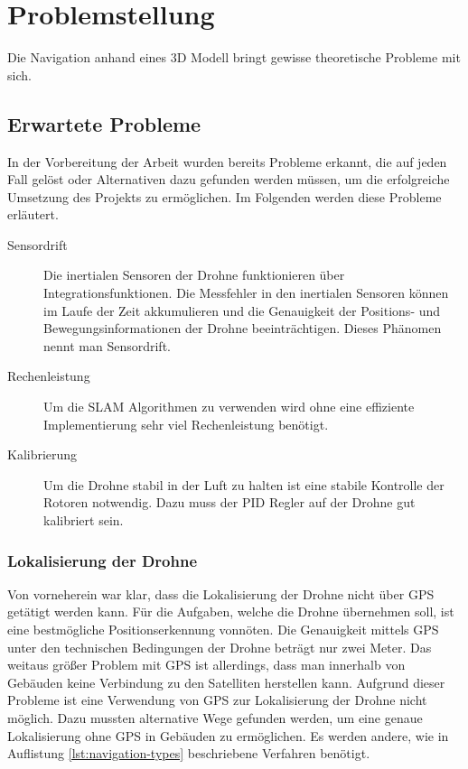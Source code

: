 \chapter{Problemstellung}

Die Navigation anhand eines 3D Modell bringt gewisse theoretische Probleme mit sich.

\section{Erwartete Probleme} \label{erwartete_probleme:section}

In der Vorbereitung der Arbeit wurden bereits Probleme erkannt, die auf jeden Fall gelöst oder Alternativen dazu gefunden werden müssen, um die erfolgreiche Umsetzung des Projekts zu ermöglichen. Im Folgenden werden diese Probleme erläutert.

\begin{description}
    \item[Sensordrift] Die inertialen Sensoren der Drohne funktionieren über Integrationsfunktionen. Die Messfehler in den inertialen Sensoren können im Laufe der Zeit akkumulieren und die Genauigkeit der Positions- und Bewegungsinformationen der Drohne beeinträchtigen. Dieses Phänomen nennt man Sensordrift.
    \item[Rechenleistung] Um die \ac{SLAM} Algorithmen zu verwenden wird ohne eine effiziente Implementierung sehr viel Rechenleistung benötigt.
    \item[Kalibrierung] Um die Drohne stabil in der Luft zu halten ist eine stabile Kontrolle der Rotoren notwendig. Dazu muss der \ac{PID} Regler auf der Drohne gut kalibriert sein.
\end{description}

\subsection{Lokalisierung der Drohne} \label{lokalisierung_der_drohne:subsection}

Von vorneherein war klar, dass die Lokalisierung der Drohne nicht über \ac{GPS} getätigt werden kann. Für die Aufgaben, welche die Drohne übernehmen soll, ist eine bestmögliche Positionserkennung vonnöten. Die Genauigkeit mittels \ac{GPS} unter den technischen Bedingungen der Drohne beträgt nur zwei Meter. Das weitaus größer Problem mit \ac{GPS} ist allerdings, dass man innerhalb von Gebäuden keine Verbindung zu den Satelliten herstellen kann. Aufgrund dieser Probleme ist eine Verwendung von \ac{GPS} zur Lokalisierung der Drohne nicht möglich. Dazu mussten alternative Wege gefunden werden, um eine genaue Lokalisierung ohne \ac{GPS} in Gebäuden zu ermöglichen. Es werden andere, wie in Auflistung \ref{lst:navigation-types} beschriebene Verfahren benötigt.

